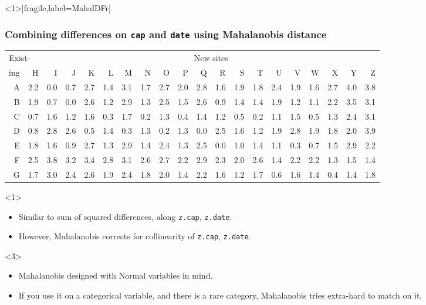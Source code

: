 \begin{frame}<1>[fragile,label=MahalDFr]
\frametitle{Combining differences on \texttt{cap} and \texttt{date} using Mahalanobis distance}
\addtolength{\tabcolsep}{-\tabcolsepadj} \vfill
{\footnotesize
\begin{tabular}{|r|rrrrrrrrrrrrrrrrrrr|}
\hline
\multicolumn{2}{|l}{Exist-} & \multicolumn{18}{c|}{New sites} \\
\multicolumn{1}{|l}{ing}& H & I & J & K & L & M & N & O & P & Q & R & S & T & U & V & W & X & Y & Z \\ 
  \hline
A & 2.2 & 0.0 & 0.7 & 2.7 & 1.4 & 3.1 & 1.7 & 2.7 & 2.0 & 2.8 & 1.6 & 1.9 & 1.8 & 2.4 & 1.9 & 1.6 & 2.7 & 4.0 & 3.8 \\ 
  B & 1.9 & 0.7 & 0.0 & 2.6 & 1.2 & 2.9 & 1.3 & 2.5 & 1.5 & 2.6 & 0.9 & 1.4 & 1.4 & 1.9 & 1.2 & 1.1 & 2.2 & 3.5 & 3.1 \\ 
  C & 0.7 & 1.6 & 1.2 & 1.6 & 0.3 & 1.7 & 0.2 & 1.3 & 0.4 & 1.4 & 1.2 & 0.5 & 0.2 & 1.1 & 1.5 & 0.5 & 1.3 & 2.4 & 3.1 \\ 
  D & 0.8 & 2.8 & 2.6 & 0.5 & 1.4 & 0.3 & 1.3 & 0.2 & 1.3 & 0.0 & 2.5 & 1.6 & 1.2 & 1.9 & 2.8 & 1.9 & 1.8 & 2.0 & 3.9 \\ 
  E & 1.8 & 1.6 & 0.9 & 2.7 & 1.3 & 2.9 & 1.4 & 2.4 & 1.3 & 2.5 & 0.0 & 1.0 & 1.4 & 1.1 & 0.3 & 0.7 & 1.5 & 2.9 & 2.2 \\ 
  F & 2.5 & 3.8 & 3.2 & 3.4 & 2.8 & 3.1 & 2.6 & 2.7 & 2.2 & 2.9 & 2.3 & 2.0 & 2.6 & 1.4 & 2.2 & 2.2 & 1.3 & 1.5 & 1.4 \\ 
  G & 1.7 & 3.0 & 2.4 & 2.6 & 1.9 & 2.4 & 1.8 & 2.0 & 1.4 & 2.2 & 1.6 & 1.2 & 1.7 & 0.6 & 1.6 & 1.4 & 0.4 & 1.4 & 1.8 \\ 
   \hline
\end{tabular}
}
\vfill \addtolength{\tabcolsep}{\tabcolsepadj}

\only<1\mynoteonly>{
  \begin{itemize}
  \item Similar to sum of squared differences, along \texttt{z.cap}, \texttt{z.date}.
\item However, Mahalanobis corrects for collinearity of \texttt{z.cap}, \texttt{z.date}.
  \end{itemize}
}
\only<3\mynoteonly>{
  \begin{itemize}
  \item Mahalanobis designed with Normal variables in mind.
  \item If you use it on a categorical variable, and there is a rare category, Mahalanobis tries extra-hard to match on it.
  \end{itemize}
}
\end{frame}

